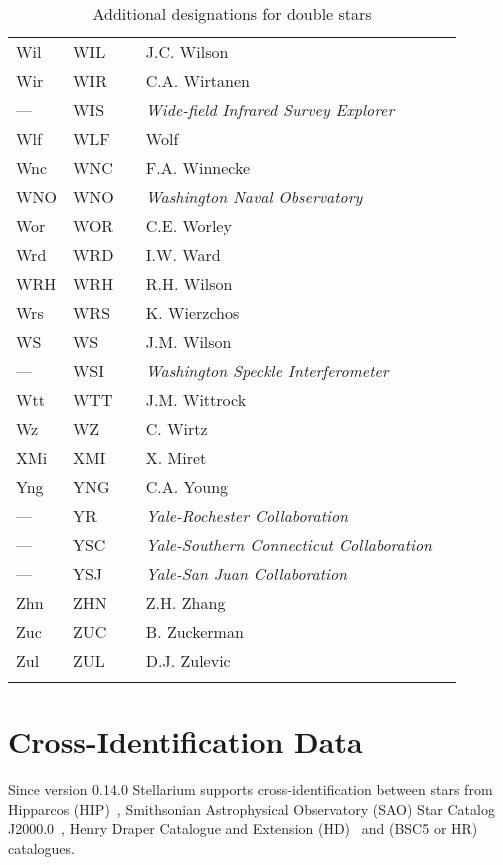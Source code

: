 \begin{longtable}{l|l|c|p{59mm}|l}
Wil & WIL &   & J.C. Wilson & \\
Wir & WIR &   & C.A. Wirtanen & \\
--- & WIS &   & \emph{Wide-field Infrared Survey Explorer} & \\
Wlf & WLF &   & Wolf & \\
Wnc & WNC &   & F.A. Winnecke & \\
WNO & WNO &   & \emph{Washington Naval Observatory} & \\
Wor & WOR &   & C.E. Worley & \\
Wrd & WRD &   & I.W. Ward & \\
WRH & WRH &   & R.H. Wilson & \\
Wrs & WRS &   & K. Wierzchos & \\
WS  & WS  &   & J.M. Wilson & \\
--- & WSI &   & \emph{Washington Speckle Interferometer} & \\
Wtt & WTT &   & J.M. Wittrock & \\
Wz  & WZ  &   & C. Wirtz & \\\midrule
XMi & XMI &   & X. Miret & \\\midrule
Yng & YNG &   & C.A. Young & \\
--- & YR  &   & \emph{Yale-Rochester Collaboration} & \\
--- & YSC &   & \emph{Yale-Southern Connecticut  Collaboration} & \\
--- & YSJ  &   & \emph{Yale-San Juan Collaboration} & \\\midrule
Zhn & ZHN &   & Z.H. Zhang & \\
Zuc  & ZUC  &   & B. Zuckerman & \\
Zul  & ZUL  &   & D.J. Zulevic & \\\bottomrule
\caption{Additional designations for double stars}
\label{tab:StarCatalogues:DoubleStars:Designations}
\end{longtable}

\section{Cross-Identification Data}
\label{sec:StarCatalogues:CrossIdentificationData}

Since version 0.14.0 Stellarium supports cross-identification between stars from 
Hipparcos (HIP)~\citep{2012AstL...38..331A}, 
Smithsonian Astrophysical Observatory (SAO) Star Catalog J2000.0~\citep{1995yCat.1131....0S}, Henry Draper Catalogue and Extension (HD)~\citep{1993yCat.3135....0C} and 
  (BSC5 or HR) %
catalogues.


